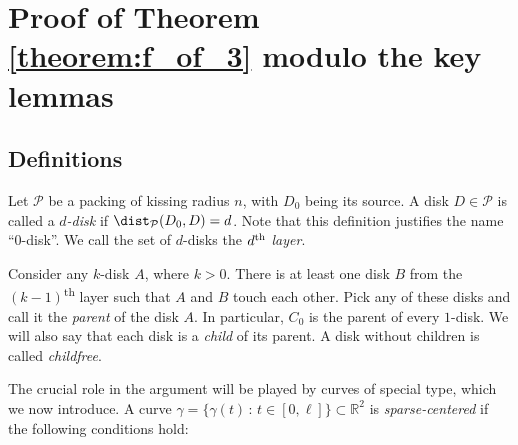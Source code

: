 \section{Proof of Theorem \ref{theorem:f_of_3} modulo the key lemmas}



\subsection{Definitions}

Let $\mathcal{P}$ be a packing of kissing radius $n$, with $D_0$ being its source. A disk $D \in \mathcal{P}$ is called a \textit{$d$-disk} if $\dist_{\mathcal{P}}(D_0, D) = d$. Note that this definition justifies the name ``0-disk''. We call the set of $d$-disks the \textit{$d\textsuperscript{th}$ layer}. %

Consider any $k$-disk $A$, where $k > 0$. There is at least one disk $B$ from the $(k-1)$\textsuperscript{th} layer such that $A$ and $B$ touch each other. Pick any of these disks and call it the \textit{parent} of the disk $A$.
In particular, $C_0$ is the parent of every $1$-disk. We will also say that each disk is a \emph{child} of its parent. A disk without children is called \emph{childfree}.

The crucial role in the argument will be played by curves of special type, which we now introduce. A curve $\gamma = \{\gamma(t)\,\colon\,t\in[0, \ell]\} \subset \mathbb{R}^2$ is \textit{sparse-centered} if the following conditions hold:

